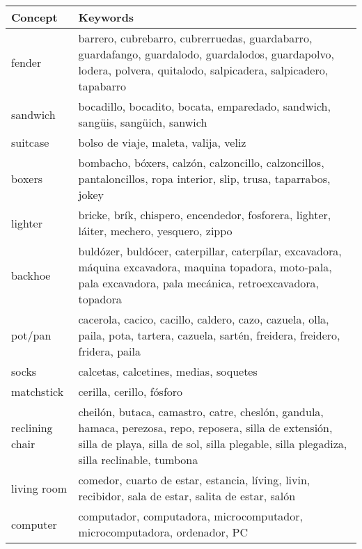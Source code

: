 \documentclass[11pt]{article}
\begin{document}
\begin{table}[t]
\begin{center}
\begin{tabularx}{\linewidth}{l X}
\hline \bf Concept & \bf Keywords \\ \hline
fender & barrero, cubrebarro, cubrerruedas, guardabarro, guardafango, guardalodo, guardalodos, guardapolvo, lodera, polvera, quitalodo, salpicadera, salpicadero, tapabarro \\
sandwich & bocadillo, bocadito, bocata, emparedado, sandwich, sangüis, sangüich, sanwich \\
suitcase & bolso de viaje, maleta, valija, veliz \\
boxers & bombacho, bóxers, calzón, calzoncillo, calzoncillos, pantaloncillos, ropa interior, slip, trusa, taparrabos, jokey \\
lighter & bricke, brík, chispero, encendedor, fosforera, lighter, láiter, mechero, yesquero, zippo \\
backhoe & buldózer, buldócer, caterpillar, caterpílar, excavadora, máquina excavadora, maquina topadora, moto-pala, pala excavadora, pala mecánica, retroexcavadora, topadora \\
pot/pan & cacerola, cacico, cacillo, caldero, cazo, cazuela, olla, paila, pota, tartera, cazuela, sartén, freidera, freidero, fridera, paila \\
socks & calcetas, calcetines, medias, soquetes \\
matchstick & cerilla, cerillo, fósforo \\
reclining chair & cheilón, butaca, camastro, catre, cheslón, gandula, hamaca, perezosa, repo, reposera, silla de extensión, silla de playa, silla de sol, silla plegable, silla plegadiza, silla reclinable, tumbona \\
living room & comedor, cuarto de estar, estancia, líving, livin, recibidor, sala de estar, salita de estar, salón \\
computer & computador, computadora, microcomputador, microcomputadora, ordenador, PC \\
\hline
\end{tabularx}
\end{center}
\end{table}
\end{document}
